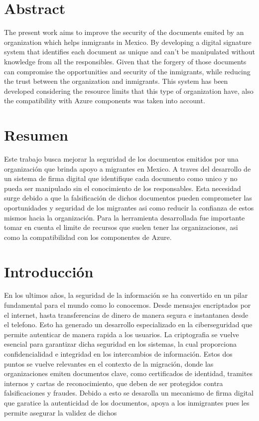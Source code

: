 \documentclass{amsart}
\begin{document}
\section{Abstract}
The present work aims to improve the security of the documents emited by an organization which helps inmigrants in Mexico. By developing a digital signature system that identifies each document as unique and can't be manipulated without knowledge from all the responsibles. Given that the forgery of those documents can compromise the opportunities and security of the inmigrants, while reducing the trust between the organization and inmigrants. This system has been developed considering the resource limits that this type of organization have, also the compatibility with Azure components was taken into account. 
\section{Resumen}
Este trabajo busca mejorar la seguridad de los documentos emitidos por una organización que brinda apoyo a migrantes en Mexico. A traves del desarrollo de un sistema de firma digital que identifique cada documento como unico y no pueda ser manipulado sin el conocimiento de los responsables. Esta necesidad surge debido a que la falsificación de dichos documentos pueden comprometer las oportunidades y seguridad de los migrantes asi como reducir la confianza de estos mismos hacia la organización. Para la herramienta desarrollada fue importante tomar en cuenta el limite de recursos que suelen tener las organizaciones, asi como la compatibilidad con los componentes de Azure.

    



    \section{Introducción}
        En los ultimos años, la seguridad de la información se ha convertido en un pilar fundamental para el mundo como lo conocemos. Desde mensajes encriptados por el internet, hasta transferencias de dinero de manera segura e instantanea desde el telefono. Esto ha generado un desarrollo especializado en la ciberseguridad que permite autenticar de manera rapida a los usuarios. La criptografia se vuelve esencial para garantizar dicha seguridad en los sistemas, la cual proporciona confidencialidad e integridad en los intercambios de información.
        Estos dos puntos se vuelve relevantes en el contexto de la migración, donde las organizaciones emiten documentos clave, como certificados de identidad, tramites internos y cartas de reconocimiento, que deben de ser protegidos contra falsificaciones y fraudes. Debido a esto se desarolla un mecanismo de firma digital que garatice la autenticidad de los documentos, apoya a los inmigrantes pues les permite asegurar la validez de dichos 
\end{document}
